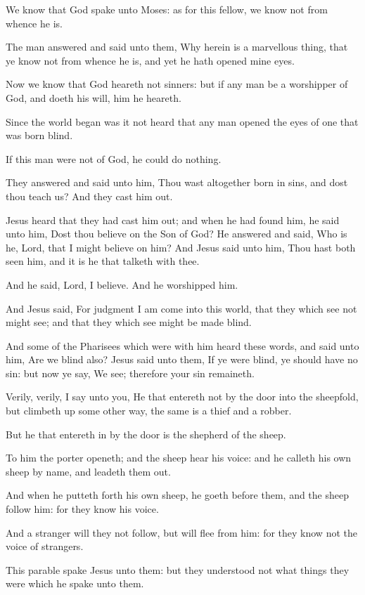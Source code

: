 \Verse We know that God spake unto Moses: as for this fellow, we know not from whence he is.

\Verse The man answered and said unto them, Why herein is a marvellous thing, that ye know not from whence he is, and yet he hath opened mine eyes.

\Verse Now we know that God heareth not sinners: but if any man be a worshipper of God, and doeth his will, him he heareth.

\Verse Since the world began was it not heard that any man opened the eyes of one that was born blind.

\Verse If this man were not of God, he could do nothing.

\Verse They answered and said unto him, Thou wast altogether born in sins, and dost thou teach us? And they cast him out.

\Verse Jesus heard that they had cast him out; and when he had found him, he said unto him, Dost thou believe on the Son of God?  \Verse He answered and said, Who is he, Lord, that I might believe on him?  \Verse And Jesus said unto him, Thou hast both seen him, and it is he that talketh with thee.

\Verse And he said, Lord, I believe. And he worshipped him.

\Verse And Jesus said, For judgment I am come into this world, that they which see not might see; and that they which see might be made blind.

\Verse And some of the Pharisees which were with him heard these words, and said unto him, Are we blind also?  \Verse Jesus said unto them, If ye were blind, ye should have no sin: but now ye say, We see; therefore your sin remaineth.


\Chapter
\Verse Verily, verily, I say unto you, He that entereth not by the door into the sheepfold, but climbeth up some other way, the same is a thief and a robber.

\Verse But he that entereth in by the door is the shepherd of the sheep.

\Verse To him the porter openeth; and the sheep hear his voice: and he calleth his own sheep by name, and leadeth them out.

\Verse And when he putteth forth his own sheep, he goeth before them, and the sheep follow him: for they know his voice.

\Verse And a stranger will they not follow, but will flee from him: for they know not the voice of strangers.

\Verse This parable spake Jesus unto them: but they understood not what things they were which he spake unto them.

